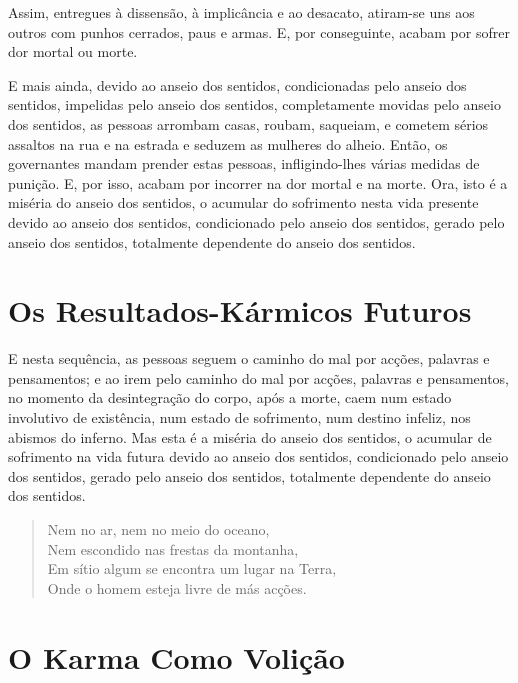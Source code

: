 Assim, entregues à dissensão, à implicância e ao desacato, atiram-se uns aos
outros com punhos cerrados, paus e armas. E, por conseguinte, acabam por sofrer
dor mortal ou morte.

E mais ainda, devido ao anseio dos sentidos, condicionadas pelo anseio dos
sentidos, impelidas pelo anseio dos sentidos, completamente movidas pelo anseio
dos sentidos, as pessoas arrombam casas, roubam, saqueiam, e cometem sérios
assaltos na rua e na estrada e seduzem as mulheres do alheio. Então, os
governantes mandam prender estas pessoas, infligindo-lhes várias medidas de
punição. E, por isso, acabam por incorrer na dor mortal e na morte. Ora, isto é
a miséria do anseio dos sentidos, o acumular do sofrimento nesta vida presente
devido ao anseio dos sentidos, condicionado pelo anseio dos sentidos, gerado
pelo anseio dos sentidos, totalmente dependente do anseio dos sentidos.


\section{Os Resultados-Kármicos Futuros}

E nesta sequência, as pessoas seguem o caminho do mal por acções, palavras e
pensamentos; e ao irem pelo caminho do mal por acções, palavras e pensamentos,
no momento da desintegração do corpo, após a morte, caem num estado involutivo
de existência, num estado de sofrimento, num destino infeliz, nos abismos do
inferno. Mas esta é a miséria do anseio dos sentidos, o acumular de sofrimento
na vida futura devido ao anseio dos sentidos, condicionado pelo anseio dos
sentidos, gerado pelo anseio dos sentidos, totalmente dependente do anseio dos
sentidos.


\begin{verse}
  Nem no ar, nem no meio do oceano,\\
  Nem escondido nas frestas da montanha,\\
  Em sítio algum se encontra um lugar na Terra,\\
  Onde o homem esteja livre de más acções.

\end{verse}

\section{O Karma Como Volição}

